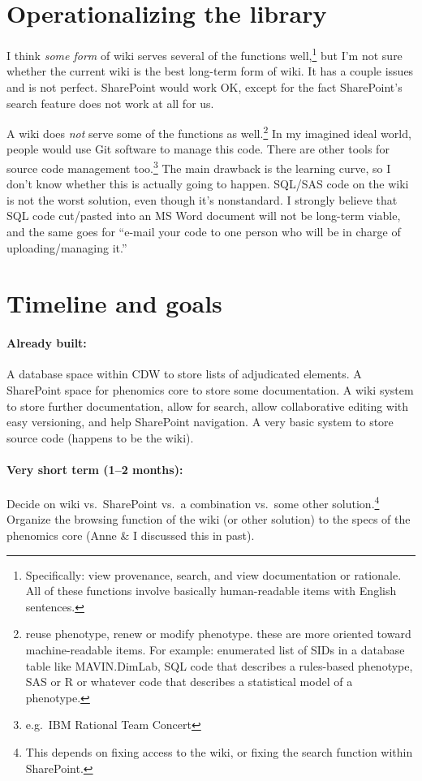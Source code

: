\documentclass{tufte-handout}
\begin{document}
\section{Operationalizing the library}

I think \emph{some form} of wiki serves several of the functions
well,\footnote{Specifically: view provenance, search, and view
  documentation or rationale. All of these functions involve basically
  human-readable items with English sentences.} but I'm not sure
whether the current wiki is the best long-term form of wiki. It has a
couple issues and is not perfect. SharePoint would work OK, except for
the fact SharePoint's search feature does not work at all for us.

A wiki does \emph{not} serve some of the functions as
well.\footnote{reuse phenotype, renew or modify phenotype. these are
  more oriented toward machine-readable items. For example: enumerated
  list of SIDs in a database table like MAVIN.DimLab, SQL code that
  describes a rules-based phenotype, SAS or R or whatever code that
  describes a statistical model of a phenotype.} In my imagined ideal
world, people would use Git software to manage this code. There are
other tools for source code management too.\footnote{e.g.\ IBM
  Rational Team Concert} The main drawback is the learning curve, so I
don't know whether this is actually going to happen. SQL/SAS code on
the wiki is not the worst solution, even though it's nonstandard. I
strongly believe that SQL code cut/pasted into an MS Word document
will not be long-term viable, and the same goes for ``e-mail your code
to one person who will be in charge of uploading/managing it.''

\section{Timeline and goals}

\paragraph{Already built:} A database space within CDW to store lists
of adjudicated elements. A SharePoint space for phenomics core to store
some documentation. A wiki system to store further documentation, allow
for search, allow collaborative editing with easy versioning, and help
SharePoint navigation. A very basic system to store source code (happens
to be the wiki).

\paragraph{Very short term (1--2 months):} Decide on wiki vs.\ SharePoint
vs.\ a combination vs.\ some other solution.\footnote{This depends on fixing access
  to the wiki, or fixing the search function within SharePoint.} Organize the browsing
function of the wiki (or other solution) to the specs of the phenomics
core (Anne \& I discussed this in past).
\end{document}
